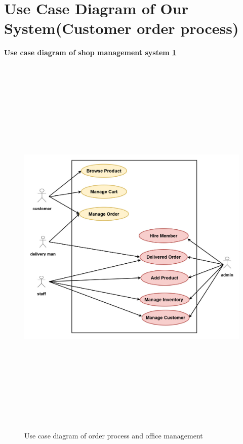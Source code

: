 \section{Use Case Diagram of Our System(Customer order process)}
\textbf{Use case diagram of shop management system \ref{fig:fig4.2}}\\
\begin{figure}[h]
    \centering  
    \includegraphics[width=\textwidth,height=19cm]{modified flow diagram/use case diagram update 05(1).jpg}
    
    \caption{Use case diagram of order process and office management}
    \label{fig:fig4.2}
\end{figure}
